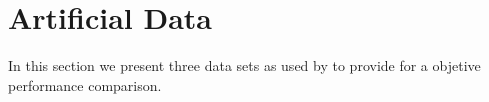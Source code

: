 \section{Artificial Data}\label{sec:artificial_data}
In this section we present three data sets as used by \cite{camci2010change,takeuchi2006unifying} to provide for a objetive performance comparison.
